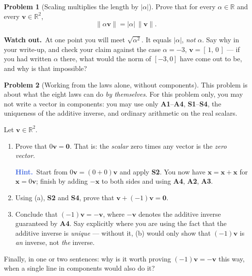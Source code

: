 \documentclass[11pt]{article}
\theoremstyle{definition}
\newtheorem{prob}{Problem}[section]
\newcommand{\heads}[1]{\par\smallskip\noindent
  {\small\sffamily\textcolor{BrickRed}{\textbf{Watch out.}}\ #1}\par\smallskip}
\newcommand{\hint}[1]{\par\smallskip\noindent
  {\small\sffamily\textcolor{RoyalBlue}{\textbf{Hint.}}\ #1}\par\smallskip}
\newcommand{\R}{\mathbb{R}}
\newcommand{\vc}[1]{\mathbf{#1}}
\newcommand{\norm}[1]{\lVert #1\rVert}
\begin{document}
\begin{prob}[Scaling multiplies the length by $\lvert\alpha\rvert$]
Prove that for every $\alpha\in\R$ and every $\vc{v}\in\R^{2}$,
\[
  \norm{\alpha\vc{v}} = \lvert\alpha\rvert\,\norm{\vc{v}} .
\]

\heads{At one point you will meet $\sqrt{\alpha^{2}}$. It equals
$\lvert\alpha\rvert$, \emph{not} $\alpha$. Say why in your write-up, and check
your claim against the case $\alpha=-3$, $\vc{v}=[\,1,\,0\,]$ --- if you had
written $\alpha$ there, what would the norm of $[-3,0]$ have come out to be, and
why is that impossible?}
\end{prob}

\begin{prob}[Working from the laws alone, without components]
This problem is about what the eight laws can do \emph{by themselves}. For this
problem only, you may not write a vector in components: you may use only
\textbf{A1}--\textbf{A4}, \textbf{S1}--\textbf{S4}, the uniqueness of the
additive inverse, and ordinary arithmetic on the real scalars.

Let $\vc{v}\in\R^{2}$.

\begin{enumerate}[label=\textbf{(\alph*)},leftmargin=2.6em,itemsep=7pt,topsep=6pt]
  \item Prove that $0\vc{v}=\vc{0}$. That is: the \emph{scalar} zero times any
        vector is the \emph{zero vector}.
        \hint{Start from $0\vc{v} = (0+0)\vc{v}$ and apply \textbf{S2}. You now
        have $\vc{x}=\vc{x}+\vc{x}$ for $\vc{x}=0\vc{v}$; finish by adding
        $-\vc{x}$ to both sides and using \textbf{A4}, \textbf{A2}, \textbf{A3}.}
  \item Using (a), \textbf{S2} and \textbf{S4}, prove that
        $\vc{v} + (-1)\vc{v} = \vc{0}$.
  \item Conclude that $(-1)\vc{v}=-\vc{v}$, where $-\vc{v}$ denotes the additive
        inverse guaranteed by \textbf{A4}. Say explicitly where you are using the
        fact that the additive inverse is \emph{unique} --- without it, (b) would
        only show that $(-1)\vc{v}$ is \emph{an} inverse, not \emph{the} inverse.
\end{enumerate}

\noindent Finally, in one or two sentences: why is it worth proving
$(-1)\vc{v}=-\vc{v}$ this way, when a single line in components would also do it?
\end{prob}
\end{document}
